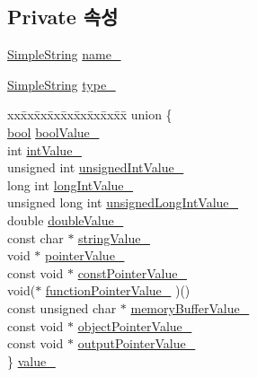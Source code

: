 \subsection*{Private 속성}
\begin{DoxyCompactItemize}
\item 
\hyperlink{class_simple_string}{Simple\+String} \hyperlink{class_mock_named_value_aac73c86e1e892f392d1fc423e25f51a8}{name\+\_\+}
\item 
\hyperlink{class_simple_string}{Simple\+String} \hyperlink{class_mock_named_value_ad41f1c1c681fbfc6ba0ef62ac34ac075}{type\+\_\+}
\item 
\begin{tabbing}
xx\=xx\=xx\=xx\=xx\=xx\=xx\=xx\=xx\=\kill
union \{\\
\>\hyperlink{avb__gptp_8h_af6a258d8f3ee5206d682d799316314b1}{bool} \hyperlink{class_mock_named_value_a09abee451cc622d483014dedcec24e58}{boolValue\_}\\
\>int \hyperlink{class_mock_named_value_a1da7506365ae1c2052808377b4a26791}{intValue\_}\\
\>unsigned int \hyperlink{class_mock_named_value_ac7bbeb1249238a3f9c83854c5794a19b}{unsignedIntValue\_}\\
\>long int \hyperlink{class_mock_named_value_afce071bcbe8335723084f41802df821b}{longIntValue\_}\\
\>unsigned long int \hyperlink{class_mock_named_value_ab8e3b434b1b928416e2b0ff65f054869}{unsignedLongIntValue\_}\\
\>double \hyperlink{class_mock_named_value_ae4bad993fe1e1b4c4b3225670868efa5}{doubleValue\_}\\
\>const char $\ast$ \hyperlink{class_mock_named_value_a5bc77c3f80ddeee4a5745eb1daec72dc}{stringValue\_}\\
\>void $\ast$ \hyperlink{class_mock_named_value_a6832f12cf49d97bb10da35211fa5039a}{pointerValue\_}\\
\>const void $\ast$ \hyperlink{class_mock_named_value_a38076acabeb10cc2757cabdb9365b46e}{constPointerValue\_}\\
\>void($\ast$ \hyperlink{class_mock_named_value_aef42fb6617558520f912651fbfe07c53}{functionPointerValue\_} )()\\
\>const unsigned char $\ast$ \hyperlink{class_mock_named_value_acfb46de823cfde8810c5bae34dd454b2}{memoryBufferValue\_}\\
\>const void $\ast$ \hyperlink{class_mock_named_value_a436d0ca15a91547fb0b3a39249a42843}{objectPointerValue\_}\\
\>const void $\ast$ \hyperlink{class_mock_named_value_aaac935d697b2f0e695e32d2293595450}{outputPointerValue\_}\\
\} \hyperlink{class_mock_named_value_a68986aee29946116b59c6189c19733ac}{value\_}\\


\end{tabbing}
\end{DoxyCompactItemize}
